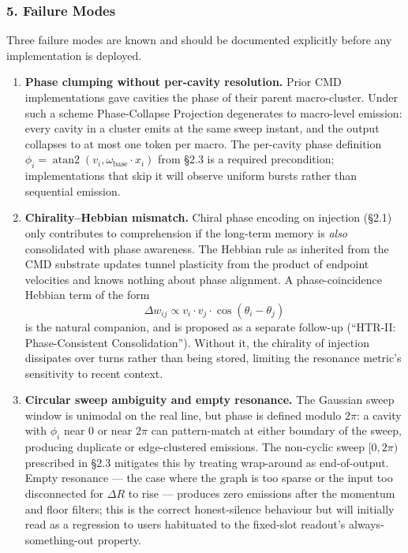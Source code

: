 \documentclass[
  11pt,
  a4paper,
]{article}
\begin{document}
\subsubsection{5. Failure Modes}\label{failure-modes}

Three failure modes are known and should be documented explicitly before
any implementation is deployed.

\begin{enumerate}
\def\labelenumi{\arabic{enumi}.}
\item
  \textbf{Phase clumping without per-cavity resolution.} Prior CMD
  implementations gave cavities the phase of their parent macro-cluster.
  Under such a scheme Phase-Collapse Projection degenerates to
  macro-level emission: every cavity in a cluster emits at the same
  sweep instant, and the output collapses to at most one token per
  macro. The per-cavity phase definition
  \(\phi_i = \operatorname{atan2}(v_i, \omega_{\text{base}} \cdot x_i)\)
  from §2.3 is a required precondition; implementations that skip it
  will observe uniform bursts rather than sequential emission.
\item
  \textbf{Chirality--Hebbian mismatch.} Chiral phase encoding on
  injection (§2.1) only contributes to comprehension if the long-term
  memory is \emph{also} consolidated with phase awareness. The Hebbian
  rule as inherited from the CMD substrate updates tunnel plasticity
  from the product of endpoint velocities and knows nothing about phase
  alignment. A phase-coincidence Hebbian term of the form
  \[ \Delta w_{ij} \propto v_i \cdot v_j \cdot \cos(\theta_i - \theta_j) \]
  is the natural companion, and is proposed as a separate follow-up
  (``HTR-II: Phase-Consistent Consolidation''). Without it, the
  chirality of injection dissipates over turns rather than being stored,
  limiting the resonance metric's sensitivity to recent context.
\item
  \textbf{Circular sweep ambiguity and empty resonance.} The Gaussian
  sweep window is unimodal on the real line, but phase is defined modulo
  \(2\pi\): a cavity with \(\phi_i\) near \(0\) or near \(2\pi\) can
  pattern-match at either boundary of the sweep, producing duplicate or
  edge-clustered emissions. The non-cyclic sweep \([0, 2\pi)\)
  prescribed in §2.3 mitigates this by treating wrap-around as
  end-of-output. Empty resonance --- the case where the graph is too
  sparse or the input too disconnected for \(\Delta R\) to rise ---
  produces zero emissions after the momentum and floor filters; this is
  the correct honest-silence behaviour but will initially read as a
  regression to users habituated to the fixed-slot readout's
  always-something-out property.
\end{enumerate}
\end{document}
